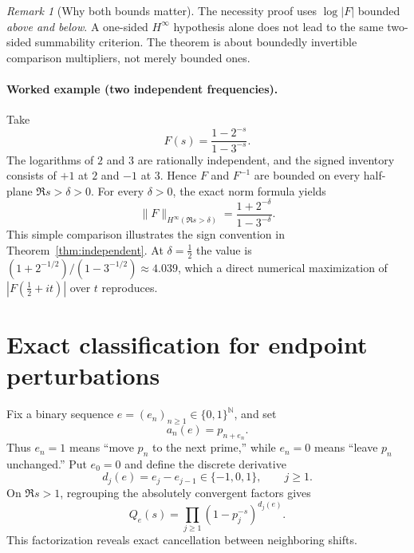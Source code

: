 \documentclass[12pt,letterpaper]{article}
\numberwithin{equation}{section}
\theoremstyle{remark}
\newtheorem{remark}[theorem]{Remark}
\begin{document}
\begin{remark}[Why both bounds matter]
The necessity proof uses $\log|F|$ bounded \emph{above and below}. A one-sided $H^\infty$ hypothesis alone does not lead to the same two-sided summability criterion. The theorem is about boundedly invertible comparison multipliers, not merely bounded ones.
\end{remark}

\paragraph{Worked example (two independent frequencies).}
Take
\[
 F(s)=\frac{1-2^{-s}}{1-3^{-s}}.
\]
The logarithms of \(2\) and \(3\) are rationally independent,
and the signed inventory consists of \(+1\) at \(2\) and
\(-1\) at \(3\). Hence \(F\) and \(F^{-1}\) are bounded
on every half-plane \(\Re s>\delta>0\).
For every \(\delta>0\), the exact norm formula yields
\[
 \|F\|_{H^\infty(\Re s>\delta)}
 =\frac{1+2^{-\delta}}{1-3^{-\delta}}.
\]
This simple comparison illustrates the sign convention
in Theorem~\ref{thm:independent}.  At $\delta=\frac12$ the value is
$(1+2^{-1/2})/(1-3^{-1/2})\approx4.039$, which a direct numerical
maximization of $|F(\frac12+it)|$ over $t$ reproduces.

\section{Exact classification for endpoint perturbations}\label{sec:endpoint}
Fix a binary sequence $e=(e_n)_{n\ge1}\in\{0,1\}^{\mathbb N}$, and set
\begin{equation}\label{eq:endpoint}
 a_n(e)=p_{n+e_n}.
\end{equation}
Thus $e_n=1$ means ``move $p_n$ to the next prime,'' while $e_n=0$ means ``leave $p_n$ unchanged.'' Put $e_0=0$ and define the discrete derivative
\[
 d_j(e)=e_j-e_{j-1}\in\{-1,0,1\},\qquad j\ge1.
\]
On $\Re s>1$, regrouping the absolutely convergent factors gives
\begin{equation}\label{eq:endpointfactor}
 Q_e(s)=\prod_{j\ge1}(1-p_j^{-s})^{d_j(e)}.
\end{equation}
This factorization reveals exact cancellation between neighboring shifts.
\end{document}
